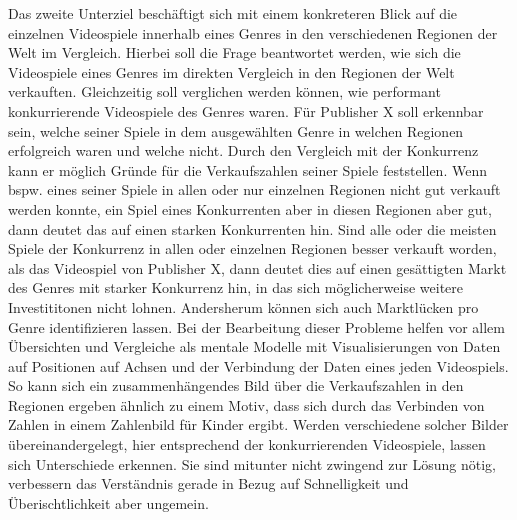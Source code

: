 \documentclass[usegeometry=true]{scrartcl}
\begin{document}
Das zweite Unterziel beschäftigt sich mit einem konkreteren Blick auf die einzelnen Videospiele innerhalb eines Genres in den verschiedenen Regionen der Welt im Vergleich. 
Hierbei soll die Frage beantwortet werden, wie sich die Videospiele eines Genres im direkten Vergleich in den Regionen der Welt verkauften. 
Gleichzeitig soll verglichen werden können, wie performant konkurrierende Videospiele des Genres waren.
Für Publisher X soll erkennbar sein, welche seiner Spiele in dem ausgewählten Genre in welchen Regionen erfolgreich waren und welche nicht. 
Durch den Vergleich mit der Konkurrenz kann er möglich Gründe für die Verkaufszahlen seiner Spiele feststellen. 
Wenn bspw. eines seiner Spiele in allen oder nur einzelnen Regionen nicht gut verkauft werden konnte, ein Spiel eines Konkurrenten aber in diesen Regionen aber gut, dann deutet das auf einen starken Konkurrenten hin. 
Sind alle oder die meisten Spiele der Konkurrenz in allen oder einzelnen Regionen besser verkauft worden, als das Videospiel von Publisher X, dann deutet dies auf einen gesättigten Markt des Genres mit starker Konkurrenz hin, in das sich möglicherweise weitere Investititonen nicht lohnen. 
Andersherum können sich auch Marktlücken pro Genre identifizieren lassen. 
Bei der Bearbeitung dieser Probleme helfen vor allem Übersichten und Vergleiche als mentale Modelle mit Visualisierungen von Daten auf Positionen auf Achsen und der Verbindung der Daten eines jeden Videospiels. 
So kann sich ein zusammenhängendes Bild über die Verkaufszahlen in den Regionen ergeben ähnlich zu einem Motiv, dass sich durch das Verbinden von Zahlen in einem Zahlenbild für Kinder ergibt. Werden verschiedene solcher Bilder übereinandergelegt, hier entsprechend der konkurrierenden Videospiele, lassen sich Unterschiede erkennen.
Sie sind mitunter nicht zwingend zur Lösung nötig, verbessern das Verständnis gerade in Bezug auf Schnelligkeit und Überischtlichkeit aber ungemein.
\end{document}
